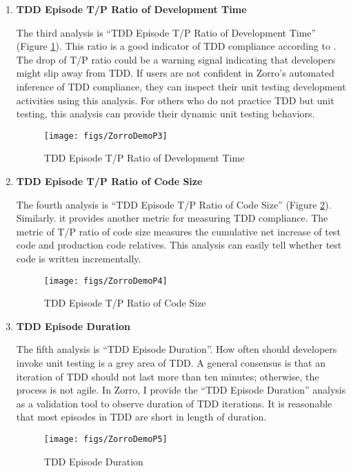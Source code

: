 \begin{enumerate}
\clearpage
\item{\textbf{TDD Episode T/P Ratio of Development Time}}

The third analysis is ``TDD Episode T/P Ratio of Development Time'' (Figure \ref{fig:ZorroDemoP3}). This ratio is a good indicator of TDD compliance according to \cite{Wang:04}. %
The drop of T/P ratio could be a warning signal indicating that developers might slip away from TDD. If users are not confident in Zorro's automated inference of TDD compliance, they can inspect their unit testing development activities using this analysis. For others who do not practice TDD but unit testing, this analysis can provide their dynamic unit testing behaviors. 
\begin{figure}[htbp]
  \centering
  \texttt{[image: figs/ZorroDemoP3]}
  \caption{TDD Episode T/P Ratio of Development Time}
  \label{fig:ZorroDemoP3}
\end{figure}

\clearpage
\item{\textbf{TDD Episode T/P Ratio of Code Size}}

The fourth analysis is ``TDD Episode T/P Ratio of Code Size'' (Figure \ref{fig:ZorroDemoP4}). Similarly. it provides another metric for measuring TDD compliance. The metric of T/P ratio of code size measures the cumulative net increase of test code and production code relatives. This analysis can easily tell whether test code is written incrementally.

\begin{figure}[htbp]
  \centering
  \texttt{[image: figs/ZorroDemoP4]}
  \caption{TDD Episode T/P Ratio of Code Size}
  \label{fig:ZorroDemoP4}
\end{figure}


\clearpage
\item{\textbf{TDD Episode Duration}}

The fifth analysis is ``TDD Episode Duration''. How often should developers invoke unit testing is a grey area of TDD. A general consensus is that an iteration of TDD should not last more than ten minutes; otherwise, the process is not agile. In Zorro, I provide the ``TDD Episode Duration'' analysis as a validation tool to observe duration of TDD iterations. It is reasonable that most episodes in TDD are short in length of duration. 
\begin{figure}[htbp]
  \centering
  \texttt{[image: figs/ZorroDemoP5]}
  \caption{TDD Episode Duration}
  \label{fig:ZorroDemoP5}
\end{figure}



\end{enumerate}
